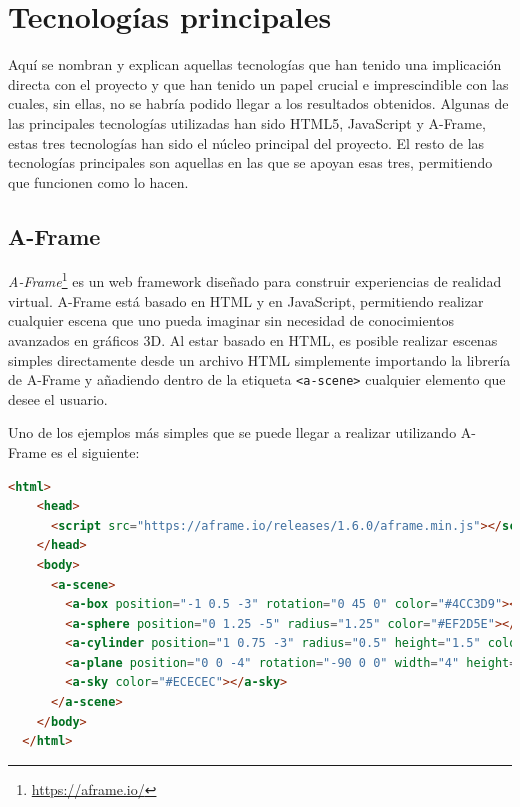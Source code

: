 \documentclass[a4paper, 12pt]{book}
\begin{document}
\section{Tecnologías principales} 
\label{sec:tecnologias-principales} %

Aquí se nombran y explican aquellas tecnologías que han tenido una implicación directa con el proyecto y que han tenido un papel crucial e imprescindible con las cuales, sin ellas, no se habría podido llegar a los resultados obtenidos. 
Algunas de las principales tecnologías utilizadas han sido HTML5, JavaScript y A-Frame, estas tres tecnologías han sido el núcleo principal del proyecto. El resto de las tecnologías principales 
son aquellas en las que se apoyan esas tres, permitiendo que funcionen como lo hacen. 

\subsection{A-Frame}
\label{subsec: A-Frame}

\textit{A-Frame}\footnote{\url{https://aframe.io/}} \cite{aframe_docs} es un web framework diseñado para construir experiencias de realidad virtual. A-Frame está basado en HTML y en JavaScript, permitiendo realizar cualquier escena que uno pueda imaginar sin necesidad de conocimientos avanzados en gráficos 3D. 
Al estar basado en HTML, es posible realizar escenas simples directamente desde un archivo HTML simplemente importando la librería de A-Frame y añadiendo dentro de la etiqueta \texttt{<a-scene>} cualquier elemento que desee el usuario.  

Uno de los ejemplos más simples que se puede llegar a realizar utilizando A-Frame es el siguiente:

\begin{lstlisting}[language=HTML, caption=Escena A-Frame básica, captionpos=b]
  <html>
    <head>
      <script src="https://aframe.io/releases/1.6.0/aframe.min.js"></script>
    </head>
    <body>
      <a-scene>
        <a-box position="-1 0.5 -3" rotation="0 45 0" color="#4CC3D9"></a-box>
        <a-sphere position="0 1.25 -5" radius="1.25" color="#EF2D5E"></a-sphere>
        <a-cylinder position="1 0.75 -3" radius="0.5" height="1.5" color="#FFC65D"></a-cylinder>
        <a-plane position="0 0 -4" rotation="-90 0 0" width="4" height="4" color="#7BC8A4"></a-plane>
        <a-sky color="#ECECEC"></a-sky>
      </a-scene>
    </body>
  </html>
\end{lstlisting}
\end{document}
